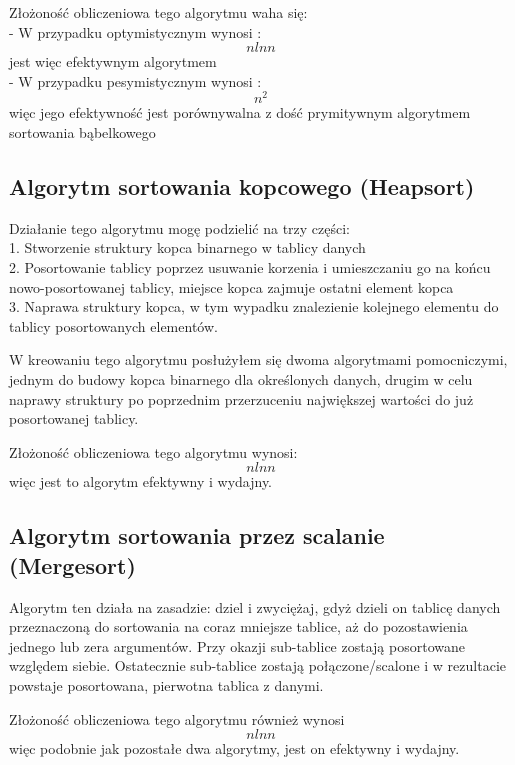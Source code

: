 \documentclass[a4paper,12pt]{article}
\begin{document}
Złożoność obliczeniowa tego algorytmu waha się: \\
- W przypadku optymistycznym wynosi : \begin{equation*}n ln n \end{equation*} jest więc efektywnym algorytmem \\
- W przypadku pesymistycznym wynosi : \begin{equation*} n^2 \end{equation*} więc jego efektywność jest porównywalna z dość prymitywnym algorytmem sortowania bąbelkowego

\subsection{Algorytm sortowania kopcowego (Heapsort)}

Działanie tego algorytmu mogę podzielić na trzy części: \\
1. Stworzenie struktury kopca binarnego w tablicy danych\\
2. Posortowanie tablicy poprzez usuwanie korzenia i umieszczaniu go na końcu nowo-posortowanej tablicy, miejsce kopca zajmuje ostatni element kopca\\
3. Naprawa struktury kopca, w tym wypadku znalezienie kolejnego elementu do tablicy posortowanych elementów.

W kreowaniu tego algorytmu posłużyłem się dwoma algorytmami pomocniczymi, jednym do budowy kopca binarnego dla określonych danych, drugim w celu naprawy struktury
po poprzednim przerzuceniu największej wartości do już posortowanej tablicy.

Złożoność obliczeniowa tego algorytmu wynosi: \[n ln n\] więc jest to algorytm efektywny i wydajny.

\subsection{Algorytm sortowania przez scalanie (Mergesort)}

Algorytm ten działa na zasadzie: dziel i zwyciężaj, gdyż dzieli on tablicę danych przeznaczoną do sortowania na coraz mniejsze tablice, aż do pozostawienia jednego
lub zera argumentów. Przy okazji sub-tablice zostają posortowane względem siebie. Ostatecznie sub-tablice zostają połączone/scalone i w rezultacie powstaje posortowana, pierwotna tablica z danymi. 

Złożoność obliczeniowa tego algorytmu również wynosi \[ n ln n\] więc podobnie jak pozostałe dwa algorytmy, jest on efektywny i wydajny.
\end{document}
